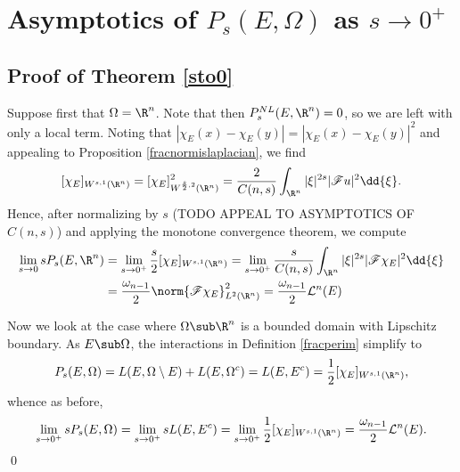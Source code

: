 \documentclass[../main.tex]{subfiles}
\begin{document}
\section{Asymptotics of $ P_{s}(E,\Omega) $ as $ s\to0^{+} $}

\subsection*{Proof of Theorem \ref{sto0}}
    Suppose first that $ \Omega = \R^{n} $. Note that then $ P_{s}^{NL}(E,\R^{n}) = 0 $, so we are left with only a local term. Noting that $ | \chi_{E}(x) - \chi_{E}(y)| = | \chi_{E}(x) - \chi_{E}(y)|^{2} $ and appealing to Proposition \ref{fracnormislaplacian}, we find
    \[
        [\chi_{E}]_{W^{s,1}(\R^{n})} = [ \chi_{E} ]_{W^{\frac{s}{2},2}(\R^{n})}^{2} = \frac{2}{C(n,s)}\int_{\R^{n}}| \xi|^{2s}|\mathscr{F}u|^{2}\dd{\xi}.
    \] 
    Hence, after normalizing by $ s $ (TODO APPEAL TO ASYMPTOTICS OF $C(n,s)$) and applying the monotone convergence theorem, we compute
    \begin{align*}
        \lim_{s\to 0} s P_{s}(E,\R^{n}) &= \lim_{s\to 0^{+}} \frac{s}{2}[ \chi_{E}]_{W^{s,1}(\R^{n})} = \lim_{s\to 0^{+}} \frac{s}{C(n,s)}\int_{\R^{n}}| \xi|^{2s}|\mathscr{F}\chi_{E}|^{2} \dd{\xi} \\
        &= \frac{\omega_{n-1}}{2} \norm{\mathscr{F} \chi_{E}}_{L^{2}(\R^{n})}^{2} = \frac{\omega_{n-1}}{2} \mathcal{L}^{n}(E)
    \end{align*}


    Now we look at the case where $ \Omega\sub \R^{n} $ is a bounded domain with Lipschitz boundary. As $ E\sub \Omega $, the interactions in Definition \ref{fracperim} simplify to 
    \[
        P_{s}(E,\Omega) = L(E, \Omega\setminus E) + L(E, \Omega^{c}) = L(E,E^{c}) = \frac{1}{2}[ \chi_{E}]_{W^{s,1}(\R^{n})},
    \]
    whence as before,
    \[
        \lim_{s\to0^{+}}sP_{s}(E,\Omega) = \lim_{s\to0^{+}} sL(E,E^{c}) = \lim_{s\to0^{+}}\frac{1}{2}[ \chi_{E}]_{W^{s,1}(\R^{n})} = \frac{\omega_{n-1}}{2}\mathcal{L}^{n}(E).
    \]
    \qed

\end{document}
